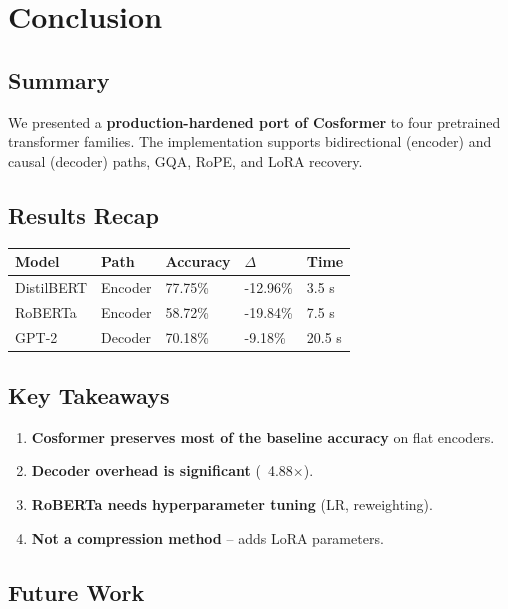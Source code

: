 
\section{Conclusion}

\subsection{Summary}

We presented a \textbf{production-hardened port of Cosformer} to four pretrained 
transformer families. The implementation supports bidirectional (encoder) 
and causal (decoder) paths, GQA, RoPE, and LoRA recovery.

\subsection{Results Recap}

\begin{table}[H]
\centering
\small
\begin{tabular}{lllll}
\toprule
\textbf{Model} & \textbf{Path} & \textbf{Accuracy} & \textbf{$\Delta$} & \textbf{Time} \\
\midrule
DistilBERT & Encoder & 77.75\% & -12.96\% & 3.5 s \\
RoBERTa & Encoder & 58.72\% & -19.84\% & 7.5 s \\
GPT-2 & Decoder & 70.18\% & -9.18\% & 20.5 s \\
\bottomrule
\end{tabular}
\end{table}

\subsection{Key Takeaways}

\begin{enumerate}
\item \textbf{Cosformer preserves most of the baseline accuracy} on flat encoders.
\item \textbf{Decoder overhead is significant} (~4.88$\times$).
\item \textbf{RoBERTa needs hyperparameter tuning} (LR, reweighting).
\item \textbf{Not a compression method} -- adds LoRA parameters.

\end{enumerate}
\subsection{Future Work}

